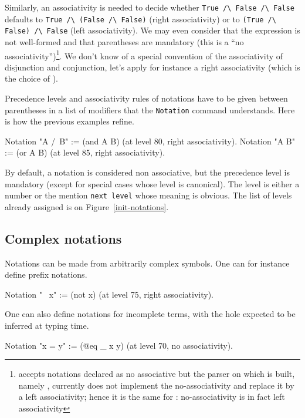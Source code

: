 Similarly, an associativity is needed to decide whether {\tt True \verb=/\=
False \verb=/\= False} defaults to {\tt True \verb=/\= (False
\verb=/\= False)} (right associativity) or to {\tt (True
\verb=/\= False) \verb=/\= False} (left associativity). We may
even consider that the expression is not well-formed and that
parentheses are mandatory (this is a ``no associativity'')\footnote{
{\Coq} accepts notations declared as no associative but the parser on
which {\Coq} is built, namely {\camlpppp}, currently does not implement the
no-associativity and replace it by a left associativity; hence it is
the same for {\Coq}: no-associativity is in fact left associativity}.
We don't know of a special convention of the associativity of
disjunction and conjunction, let's apply for instance a right
associativity (which is the choice of {\Coq}).

Precedence levels and associativity rules of notations have to be
given between parentheses in a list of modifiers that the
\texttt{Notation} command understands. Here is how the previous
examples refine.

\begin{coq_example*}
Notation "A /\ B" := (and A B) (at level 80, right associativity).
Notation "A \/ B" := (or A B)  (at level 85, right associativity).
\end{coq_example*}

By default, a notation is considered non associative, but the
precedence level is mandatory (except for special cases whose level is
canonical). The level is either a number or the mention {\tt next
level} whose meaning is obvious. The list of levels already assigned
is on Figure~\ref{init-notations}.

\subsection{Complex notations}

Notations can be made from arbitrarily complex symbols. One can for
instance define prefix notations.

\begin{coq_example*}
Notation "~ x" := (not x) (at level 75, right associativity).
\end{coq_example*}

One can also define notations for incomplete terms, with the hole
expected to be inferred at typing time.

\begin{coq_example*}
Notation "x = y" := (@eq _ x y) (at level 70, no associativity).
\end{coq_example*}

